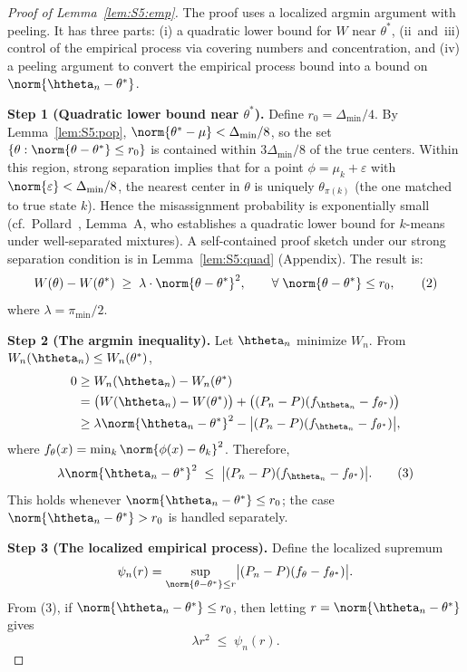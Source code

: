 \begin{proof}[Proof of Lemma~\ref{lem:S5:emp}]
The proof uses a localized argmin argument with peeling.  It has three
parts: (i) a quadratic lower bound for $W$ near $\theta^*$,
(ii~and~iii) control of the empirical process via covering numbers and
concentration, and (iv) a peeling argument to convert the empirical
process bound into a bound on $\norm{\htheta_n-\theta^*}$.

\noindent\textbf{Step 1 (Quadratic lower bound near $\theta^*$).}
Define $r_0=\Delta_{\min}/4$.  By Lemma~\ref{lem:S5:pop},
$\norm{\theta^*-\mu}<\Delta_{\min}/8$, so the set
$\{\theta:\norm{\theta-\theta^*}\le r_0\}$ is contained within
$3\Delta_{\min}/8$ of the true centers.  Within this region, strong
separation implies that for a point $\phi=\mu_k+\varepsilon$ with
$\norm{\varepsilon}<\Delta_{\min}/8$, the nearest center in $\theta$ is
uniquely $\theta_{\pi(k)}$ (the one matched to true state $k$).  Hence
the misassignment probability is exponentially small
(cf.\ Pollard~\cite{pollard1981strong}, Lemma~A, who establishes a
quadratic lower bound for $k$-means under well-separated mixtures).
A self-contained proof sketch under our strong separation condition is
in Lemma~\ref{lem:S5:quad} (Appendix).  The result is:
\[
W(\theta)-W(\theta^*)\;\ge\;\lambda\cdot\norm{\theta-\theta^*}^2,
\qquad \forall\;\norm{\theta-\theta^*}\le r_0,
\tag{2}
\]
where $\lambda=\pi_{\min}/2$.

\noindent\textbf{Step 2 (The argmin inequality).}
Let $\htheta_n$ minimize $W_n$.  From $W_n(\htheta_n)\le W_n(\theta^*)$,
\begin{align*}
0 &\ge W_n(\htheta_n)-W_n(\theta^*) \\
  &= \bigl(W(\htheta_n)-W(\theta^*)\bigr)
     + \bigl((P_n-P)(f_{\htheta_n}-f_{\theta^*})\bigr) \\
  &\ge \lambda\norm{\htheta_n-\theta^*}^2
     - \bigl|(P_n-P)(f_{\htheta_n}-f_{\theta^*})\bigr|,
\end{align*}
where $f_\theta(x)=\min_k\norm{\phi(x)-\theta_k}^2$.  Therefore,
\begin{equation}
\lambda\norm{\htheta_n-\theta^*}^2
\;\le\; \bigl|(P_n-P)(f_{\htheta_n}-f_{\theta^*})\bigr|.
\tag{3}
\end{equation}
This holds whenever $\norm{\htheta_n-\theta^*}\le r_0$; the case
$\norm{\htheta_n-\theta^*}>r_0$ is handled separately.

\noindent\textbf{Step 3 (The localized empirical process).}
Define the localized supremum
\[
\psi_n(r)=\sup_{\norm{\theta-\theta^*}\le r}
          \bigl|(P_n-P)(f_\theta-f_{\theta^*})\bigr|.
\]
From (3), if $\norm{\htheta_n-\theta^*}\le r_0$, then letting
$r=\norm{\htheta_n-\theta^*}$ gives
\begin{equation}
\lambda r^2 \;\le\; \psi_n(r).
\tag{4}
\end{equation}


\end{proof}
